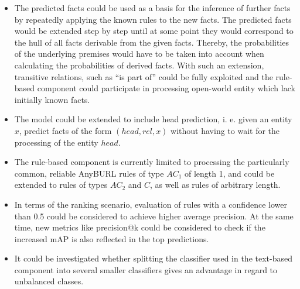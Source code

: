 \begin{itemize}
    \item The predicted facts could be used as a basis for the inference of further facts by repeatedly applying the known rules to the new facts. The predicted facts would be extended step by step until at some point they would correspond to the hull of all facts derivable from the given facts. Thereby, the probabilities of the underlying premises would have to be taken into account when calculating the probabilities of derived facts. With such an extension, transitive relations, such as ``is part of'' could be fully exploited and the rule-based component could participate in processing open-world entity which lack initially known facts.

    \item The model could be extended to include head prediction, i. e. given an entity $x$, predict facts of the form $(head, rel, x)$ without having to wait for the processing of the entity $head$.

    \item The rule-based component is currently limited to processing the particularly common, reliable AnyBURL rules of type $AC_1$ of length 1, and could be extended to rules of types $AC_2$ and $C$, as well as rules of arbitrary length.

    \item In terms of the ranking scenario, evaluation of rules with a confidence lower than 0.5 could be considered to achieve higher average precision. At the same time, new metrics like precision@k could be considered to check if the increased mAP is also reflected in the top predictions.

    \item It could be investigated whether splitting the classifier used in the text-based component into several smaller classifiers gives an advantage in regard to unbalanced classes.
\end{itemize}
